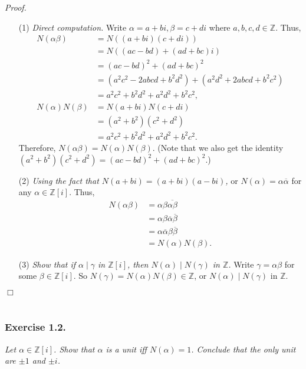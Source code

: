\documentclass{article}
\begin{document}
\emph{Proof.}
\begin{enumerate}
\item[(1)]
\emph{Direct computation.}
Write $\alpha = a+bi, \beta=c+di$ where $a, b, c, d \in \mathbb{Z}$.
Thus,
\begin{align*}
N(\alpha\beta)
&= N((a+bi)(c+di)) \\
&= N((ac-bd) + (ad+bc)i) \\
&= (ac-bd)^2 + (ad+bc)^2 \\
&= (a^2 c^2 - 2abcd + b^2 d^2) + (a^2 d^2 + 2abcd + b^2 c^2) \\
&= a^2 c^2 + b^2 d^2 + a^2 d^2 + b^2 c^2, \\
N(\alpha)N(\beta)
&= N(a+bi) N(c+di) \\
&= (a^2 + b^2)(c^2 + d^2) \\
&= a^2 c^2 + b^2 d^2 + a^2 d^2 + b^2 c^2.
\end{align*}
Therefore, $N(\alpha\beta) = N(\alpha)N(\beta)$.
(Note that we also get the identity
$(a^2 + b^2)(c^2 + d^2) = (ac-bd)^2 + (ad+bc)^2$.)
\item[(2)]
\emph{Using the fact that $N(a+bi) = (a+bi)(a-bi)$,}
or $N(\alpha) = \alpha \overline{\alpha}$
for any $\alpha \in \mathbb{Z}[i]$.
Thus,
\begin{align*}
N(\alpha\beta)
&= \alpha\beta\overline{\alpha\beta} \\
&= \alpha\beta\overline{\alpha}\overline{\beta} \\
&= \alpha\overline{\alpha}\beta\overline{\beta} \\
&= N(\alpha)N(\beta).
\end{align*}
\item[(3)]
\emph{Show that if $\alpha \mid \gamma$ in $\mathbb{Z}[i]$,
then $N(\alpha) \mid N(\gamma)$ in $\mathbb{Z}$.}
Write $\gamma = \alpha \beta$ for some $\beta \in \mathbb{Z}[i]$.
So $N(\gamma) = N(\alpha) N(\beta) \in \mathbb{Z}$,
or $N(\alpha) \mid N(\gamma)$ in $\mathbb{Z}$.
\end{enumerate}
$\Box$ \\\\






\subsubsection*{Exercise 1.2.}
\emph{Let $\alpha \in \mathbb{Z}[i]$.
Show that $\alpha$ is a unit iff $N(\alpha) = 1$.
Conclude that the only unit are $\pm 1$ and $\pm i$.} \\
\end{document}
